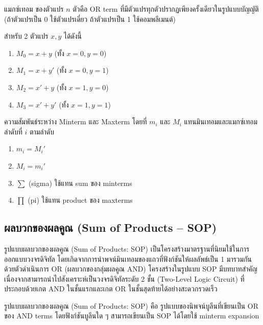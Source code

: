 \begin{definition}
แมกซ์เทอม ของตัวแปร $n$ ตัวคือ OR term ที่มีตัวแปรทุกตัวปรากฏเพียงครั้งเดียวในรูปแบบบัญญัติ (ถ้าตัวแปรเป็น 0 ใช้ตัวแปรเดี่ยว ถ้าตัวแปรเป็น 1 ใช้คอมพลีเมนต์)

สำหรับ 2 ตัวแปร $x, y$ ได้ดังนี้
\begin{enumerate}
    \item $M_0 = x + y$ (ทั้ง $x = 0, y = 0$)
    \item $M_1 = x + y'$ (ทั้ง $x = 0, y = 1$)
    \item $M_2 = x' + y$ (ทั้ง $x = 1, y = 0$)
    \item $M_3 = x' + y'$ (ทั้ง $x = 1, y = 1$)
\end{enumerate}
\end{definition}

\begin{prop}
ความสัมพันธ์ระหว่าง Minterm และ Maxterm โดยที่ $m_i$ และ $M_i$ แทนมินเทอมและแมกซ์เทอมลำดับที่ $i$ ตามลำดับ
\begin{enumerate}
    \item $m_i = M_i'$
    \item $M_i = m_i'$
    \item $\sum$ (sigma) ใช้แทน sum ของ minterms
    \item $\prod$ (pi) ใช้แทน product ของ maxterms
\end{enumerate}
\end{prop}

\subsection{ผลบวกของผลคูณ (Sum of Products -- SOP)}
รูปแบบผลบวกของผลคูณ (Sum of Products: SOP) เป็นโครงสร้างมาตรฐานที่นิยมใช้ในการออกแบบวงจรดิจิทัล โดยเกิดจากการนำพจน์มินเทอมของแถวที่ฟังก์ชันให้ผลลัพธ์เป็น 1 มารวมกันด้วยตัวดำเนินการ OR (ผลบวกของกลุ่มผลคูณ AND) โครงสร้างในรูปแบบ SOP มีบทบาทสำคัญเนื่องจากสามารถนำไปสังเคราะห์เป็นวงจรดิจิทัลระดับ 2 ชั้น (Two-Level Logic Circuit) ที่ประกอบด้วยเกต AND ในชั้นแรกและเกต OR ในชั้นสุดท้ายได้อย่างสะดวกรวดเร็ว~\parencite{kolman2008discrete}

\begin{definition}
รูปแบบผลบวกของผลคูณ (Sum of Products: SOP) คือ รูปแบบของนิพจน์บูลีนที่เขียนเป็น OR ของ AND terms โดยฟังก์ชันบูลีนใด ๆ สามารถเขียนเป็น SOP ได้โดยใช้ minterm expansion
\end{definition}

